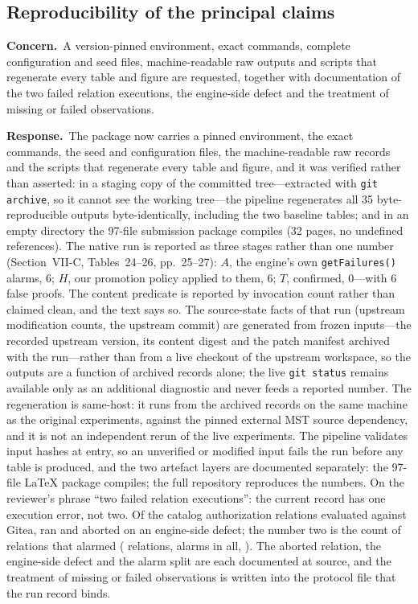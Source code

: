 \documentclass[10pt,letterpaper]{article}
\newcommand{\Concern}[1]{\par\smallskip\noindent\textbf{Concern.}\ #1\par}
\newcommand{\Response}[1]{\par\smallskip\noindent\textbf{Response.}\ #1\par}
\begin{document}
\subsection{Reproducibility of the principal claims}
\Concern{A version-pinned environment, exact commands, complete configuration and
seed files, machine-readable raw outputs and scripts that regenerate every table
and figure are requested, together with documentation of the two failed relation
executions, the engine-side defect and the treatment of missing or failed
observations.}
\Response{The package now carries a pinned environment, the exact commands, the
seed and configuration files, the machine-readable raw records and the scripts
that regenerate every table and figure, and it was verified rather than asserted: in a
staging copy of the committed tree---extracted with \texttt{git archive}, so it
cannot see the working tree---the pipeline regenerates all 35 byte-reproducible outputs byte-identically, including the two baseline tables; and in an empty
directory the 97-file submission package compiles (32 pages, no undefined references). The native run is reported as three stages rather than one
number (Section~VII-C, Tables~24--26, pp.~25--27): $A$, the engine's own
\texttt{getFailures()} alarms, 6; $H$, our promotion policy applied to them, 6;
$T$, confirmed, 0---with 6 false proofs. The content predicate is reported by
invocation count rather than claimed clean, and the text says so. The
source-state facts of that run (upstream modification counts, the upstream
commit) are generated from frozen inputs---the recorded upstream version,
its content digest and the patch manifest archived with the run---rather than
from a live checkout of the upstream workspace, so the outputs are a function
of archived records alone; the live \texttt{git status} remains available only
as an additional diagnostic and never feeds a reported number. The regeneration
is same-host: it runs from the archived records on the same machine as the
original experiments, against the pinned external MST source dependency, and it
is not an independent rerun of the live experiments. The pipeline
validates input hashes at entry, so an unverified or modified input fails the
run before any table is produced, and the two
artefact layers are documented separately: the 97-file LaTeX package
compiles; the full repository reproduces the numbers.
On the
reviewer's phrase ``two failed relation executions'': the current record has one
execution error, not two. Of the \NtMrTotal{} catalog authorization relations
evaluated against Gitea, \NtMrExecuted{} ran and \NtMrErrored{} aborted on an
engine-side defect; the number two is the count of relations that alarmed
(\NtMrFired{} relations, \NtAlarms{} alarms in all, \NtKeyMrNames{}). The
aborted relation, the engine-side defect and the alarm split are each documented
at source, and the treatment of missing or failed observations is written into
the protocol file that the run record binds.}
\end{document}
